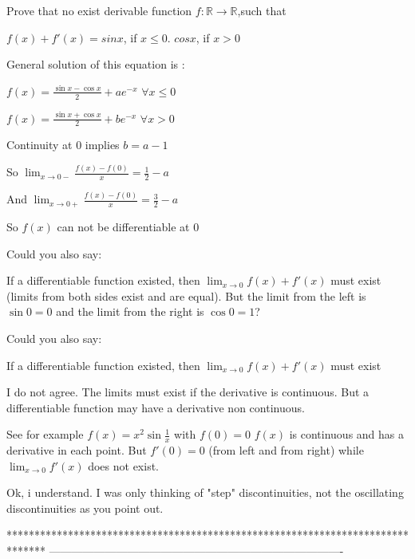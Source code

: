 \begin{solution}
	\begin{tcolorbox}Prove that no exist derivable function $f: \mathbb{R}\to\mathbb{R}$,such that


$f(x)+f'(x)=sinx$, if $x\leq0$.   $cosx$, if $x> 0$\end{tcolorbox}
General solution of this equation is :

$f(x)=\frac{\sin x-\cos x}2+ae^{-x}$ $\forall x\le 0$

$f(x)=\frac{\sin x+\cos x}2+be^{-x}$ $\forall x> 0$

Continuity at $0$ implies $b=a-1$

So $\lim_{x\to 0-}\frac{f(x)-f(0)}x=\frac 12-a$

And $\lim_{x\to 0+}\frac{f(x)-f(0)}x=\frac 32-a$

So $f(x)$ can not be differentiable at $0$
\end{solution}



\begin{solution}
	Could you also say:

If a differentiable function existed, then $\lim_{x\to0}f(x)+f'(x)$ must exist (limits from both sides exist and are equal).  But the limit from the left is $\sin0=0$ and the limit from the right is $\cos0=1$?
\end{solution}



\begin{solution}
	\begin{tcolorbox}Could you also say:

If a differentiable function existed, then $\lim_{x\to0}f(x)+f'(x)$ must exist \end{tcolorbox}

I do not agree. The limits must exist if the derivative is continuous. But a differentiable function may have a derivative non continuous.

See for example $f(x)=x^2\sin\frac 1x$ with $f(0)=0$
$f(x)$ is continuous and has a derivative in each point. But $f'(0)=0$ (from left and from right) while $\lim_{x\to 0}f'(x)$ does not exist.
\end{solution}



\begin{solution}
	Ok, i understand.  I was only thinking of "step" discontinuities, not the oscillating discontinuities as you point out.
\end{solution}
*******************************************************************************
-------------------------------------------------------------------------------

